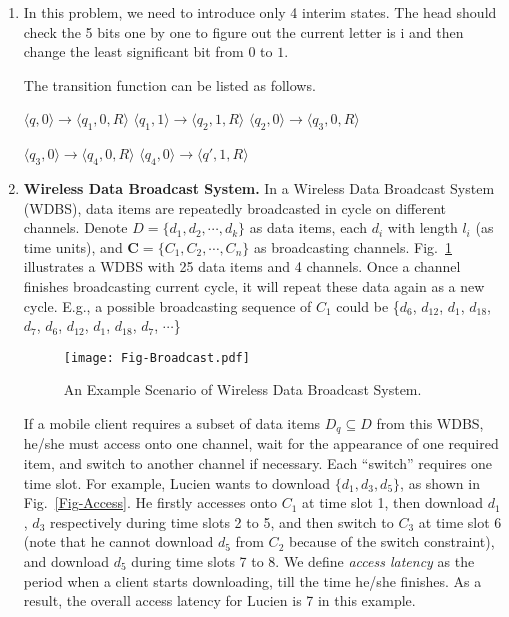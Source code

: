\documentclass[12pt,a4paper]{article}
\makeatletter
\newtheorem*{solution}{Solution}
\theoremstyle{definition}
\renewenvironment{solution}[1][Solution] {\par\pushQED{\qed}\normalfont\topsep6\p@\@plus6\p@\relax\trivlist\item[\hskip\labelsep\bfseries#1\@addpunct{.}]\ignorespaces}{\popQED\endtrivlist\@endpefalse} \makeatother
\makeatother
\begin{document}
\begin{enumerate}
\begin{solution}
	In this problem, we need to introduce only 4 interim states. The head should check the 5 bits one by one to figure out the current letter is i and then change the least significant bit from $0$ to $1$.
	
	The transition function can be listed as follows.
	
	$\langle q,0 \rangle \rightarrow \langle q_1,0,R \rangle$\quad
	$\langle q_1,1 \rangle \rightarrow \langle q_2,1,R \rangle $\quad
	$\langle q_2,0 \rangle \rightarrow \langle q_3,0,R \rangle $\quad
	
	$\langle q_3,0 \rangle \rightarrow \langle q_4,0,R \rangle $\quad
	$\langle q_4,0 \rangle \rightarrow \langle q',1,R \rangle $  
\end{solution}

\item \textbf{Wireless Data Broadcast System.}
In a Wireless Data Broadcast System (WDBS), data items are repeatedly broadcasted in cycle on different channels. Denote $D = \{d_1, d_2,\cdots, d_k\}$ as data items, each $d_i$ with length $l_i$ (as time units), and $\mathbf{C}=\{C_1, C_2, \cdots, C_n\}$ as broadcasting channels. Fig.~\ref{Fig-Broadcast} illustrates a WDBS with 25 data items and 4 channels. Once a channel finishes broadcasting current cycle, it will repeat these data again as a new cycle. E.g., a possible broadcasting sequence of $C_1$ could be \{$d_6$, $d_{12}$, $d_1$, $d_{18}$, $d_7$, $d_6$, $d_{12}$, $d_1$, $d_{18}$, $d_7$, $\cdots$\}

\begin{figure}[h]
	\centering
	\texttt{[image: Fig-Broadcast.pdf]}
	\caption{An Example Scenario of Wireless Data Broadcast System.} \label{Fig-Broadcast}
\end{figure}

If a mobile client requires a subset of data items $D_q \subseteq D$ from this WDBS, he/she must access onto one channel, wait for the appearance of one required item, and switch to another channel if necessary. Each ``switch'' requires one time slot. For example, Lucien wants to download $\{d_1, d_3, d_5\}$, as shown in Fig.~\ref{Fig-Access}. He firstly accesses onto $C_1$ at time slot 1, then download $d_1$, $d_3$ respectively during time slots 2 to 5, and then switch to $C_3$ at time slot 6 (note that he cannot download $d_5$ from $C_2$ because of the switch constraint), and download $d_5$ during time slots 7 to 8. We define \emph{access latency} as the period when a client starts downloading, till the time he/she finishes. As a result, the overall access latency for Lucien is 7 in this example.


\end{enumerate}
\end{document}
